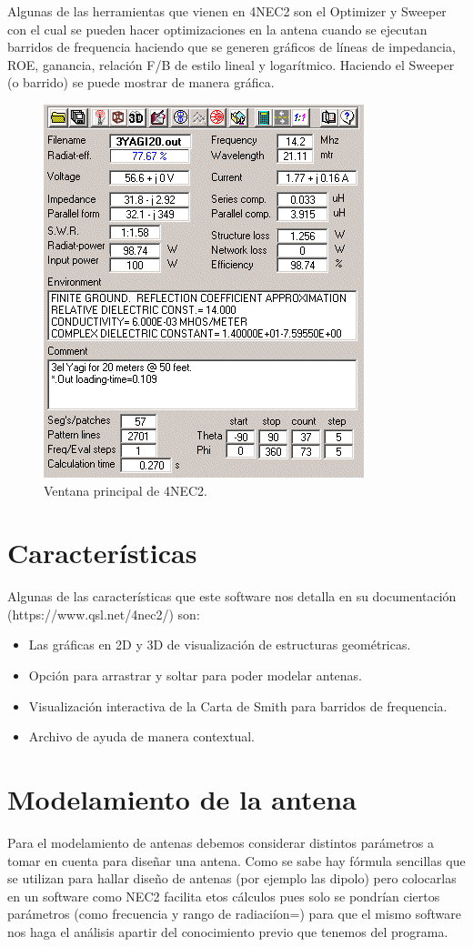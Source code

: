 \documentclass[12pt]{article}
\begin{document}
Algunas de las herramientas que vienen en 4NEC2 son el Optimizer y Sweeper con
el cual se pueden hacer optimizaciones en la antena cuando se ejecutan barridos
de frequencia haciendo que se generen gráficos de líneas de impedancia, ROE,
ganancia, relación F/B de estilo lineal y logarítmico. Haciendo el Sweeper (o
barrido) se puede mostrar de manera gráfica.

\begin{figure}[H]
\centering
\includegraphics[width=.4\linewidth]{images/image002.png}
\caption{Ventana principal de 4NEC2.}
\end{figure}

\section{Características}

Algunas de las características que este software nos detalla en su
documentación (https://www.qsl.net/4nec2/) son:

\begin{itemize}
\item Las gráficas en 2D y 3D de visualización de estructuras geométricas.
\item Opción para arrastrar y soltar para poder modelar antenas.
\item Visualización interactiva de la Carta de Smith para barridos de
frequencia.
\item Archivo de ayuda de manera contextual.
\end{itemize}

\section{Modelamiento de la antena}

Para el modelamiento de antenas debemos considerar distintos parámetros a tomar
en cuenta para diseñar una antena. Como se sabe hay fórmula sencillas que se
utilizan para hallar diseño de antenas (por ejemplo las dipolo) pero colocarlas
en un software como NEC2 facilita etos cálculos pues solo se pondrían ciertos
parámetros (como frecuencia y rango de radiaciíon=) para que el mismo software
nos haga el análisis apartir del conocimiento previo que tenemos del programa.
\end{document}
